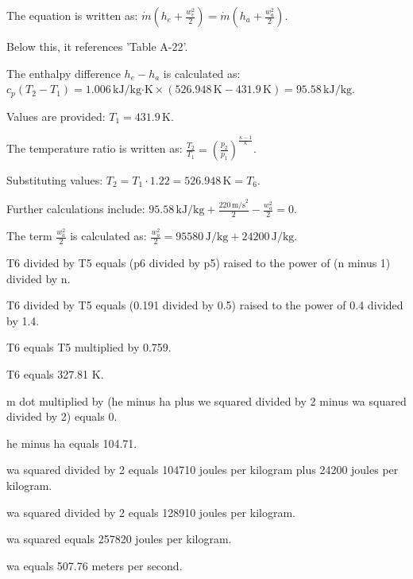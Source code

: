 The equation is written as:  
\( \dot{m} \left( h_e + \frac{w_e^2}{2} \right) = \dot{m} \left( h_a + \frac{w_a^2}{2} \right) \).  

Below this, it references 'Table A-22'.  

The enthalpy difference \( h_e - h_a \) is calculated as:  
\( c_p (T_2 - T_1) = 1.006 \, \text{kJ/kg·K} \times (526.948 \, \text{K} - 431.9 \, \text{K}) = 95.58 \, \text{kJ/kg} \).  

Values are provided:  
\( T_1 = 431.9 \, \text{K} \).  

The temperature ratio is written as:  
\( \frac{T_2}{T_1} = \left( \frac{p_2}{p_1} \right)^{\frac{\kappa - 1}{\kappa}} \).  

Substituting values:  
\( T_2 = T_1 \cdot 1.22 = 526.948 \, \text{K} = T_6 \).  

Further calculations include:  
\( 95.58 \, \text{kJ/kg} + \frac{220 \, \text{m/s}^2}{2} - \frac{w_a^2}{2} = 0 \).  

The term \( \frac{w_a^2}{2} \) is calculated as:  
\( \frac{w_a^2}{2} = 95580 \, \text{J/kg} + 24200 \, \text{J/kg} \).

T6 divided by T5 equals (p6 divided by p5) raised to the power of (n minus 1) divided by n.  

T6 divided by T5 equals (0.191 divided by 0.5) raised to the power of 0.4 divided by 1.4.  

T6 equals T5 multiplied by 0.759.  

T6 equals 327.81 K.  

m dot multiplied by (he minus ha plus we squared divided by 2 minus wa squared divided by 2) equals 0.  

he minus ha equals 104.71.  

wa squared divided by 2 equals 104710 joules per kilogram plus 24200 joules per kilogram.  

wa squared divided by 2 equals 128910 joules per kilogram.  

wa squared equals 257820 joules per kilogram.  

wa equals 507.76 meters per second.